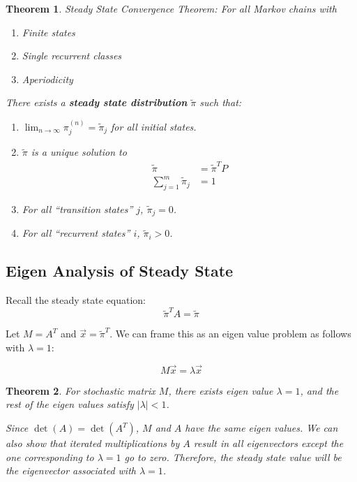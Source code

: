 \documentclass[a4paper,12pt]{report}
\newtheorem{theorem}{Theorem}
\begin{document}
\begin{theorem}{Steady State Convergence Theorem: }
For all Markov chains with 
\begin{enumerate}
\item Finite states
\item Single recurrent classes
\item Aperiodicity
\end{enumerate}

There exists a \textbf{steady state distribution} $\tilde \pi$ such that:
\begin{enumerate}
\item $\lim_{n\to \infty} \pi_j^{(n)} = \tilde \pi_j$ for all initial states.

\item $\tilde \pi$ is a unique solution to
\begin{equation}
\begin{split}
\tilde\pi &= \tilde\pi^T P \\
\sum_{j=1}^{m} \tilde\pi_j &= 1
\end{split}
\end{equation}

\item For all ``transition states'' $j$, $\tilde\pi_j = 0$.
\item For all ``recurrent states'' $i$, $\tilde\pi_i > 0$.
\end{enumerate}
\end{theorem}


\subsection{Eigen Analysis of Steady State}

Recall the steady state equation: 
\begin{equation}
\tilde \pi^T A = \tilde\pi
\end{equation}

Let $M = A^T$ and $\vec x = \tilde\pi^T$. We can frame this as an eigen value problem as follows with $\lambda = 1$:

\begin{equation}
M\vec x = \lambda \vec x
\end{equation}

\begin{theorem}{}
For stochastic matrix $M$, there exists eigen value $\lambda = 1$, and the rest of the eigen values satisfy $|\lambda| < 1$.


Since $\det(A) = \det(A^T)$, $M$ and $A$ have the same eigen values. We can also show that iterated multiplications by $A$ result in all eigenvectors except the one corresponding to $\lambda = 1$ go to zero. Therefore, the steady state value will be the eigenvector associated with $\lambda =1$.
\end{theorem}
\end{document}
